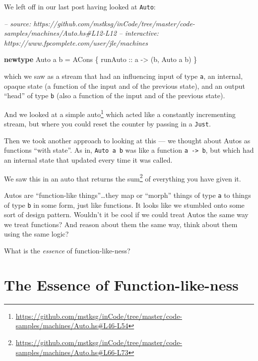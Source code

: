 \documentclass[]{article}
\newenvironment{Shaded}{}{}
\newcommand{\CommentTok}[1]{\textcolor[rgb]{0.38,0.63,0.69}{\textit{#1}}}
\newcommand{\DataTypeTok}[1]{\textcolor[rgb]{0.56,0.13,0.00}{#1}}
\newcommand{\FunctionTok}[1]{\textcolor[rgb]{0.02,0.16,0.49}{#1}}
\newcommand{\KeywordTok}[1]{\textcolor[rgb]{0.00,0.44,0.13}{\textbf{#1}}}
\newcommand{\NormalTok}[1]{#1}
\newcommand{\OtherTok}[1]{\textcolor[rgb]{0.00,0.44,0.13}{#1}}
\renewcommand{\href}[2]{#2\footnote{\url{#1}}}
\begin{document}
We left off in our last post having looked at \texttt{Auto}:

\begin{Shaded}
\begin{Highlighting}[]
\CommentTok{-- source: https://github.com/mstksg/inCode/tree/master/code-samples/machines/Auto.hs#L12-L12}
\CommentTok{-- interactive: https://www.fpcomplete.com/user/jle/machines}

\KeywordTok{newtype} \DataTypeTok{Auto}\NormalTok{ a b }\FunctionTok{=} \DataTypeTok{ACons}\NormalTok{ \{}\OtherTok{ runAuto ::}\NormalTok{ a }\OtherTok{->}\NormalTok{ (b, }\DataTypeTok{Auto}\NormalTok{ a b) \}}
\end{Highlighting}
\end{Shaded}

which we saw as a stream that had an influencing input of type \texttt{a}, an
internal, opaque state (a function of the input and of the previous state), and
an output ``head'' of type \texttt{b} (also a function of the input and of the
previous state).

And we looked at
\href{https://github.com/mstksg/inCode/tree/master/code-samples/machines/Auto.hs\#L46-L54}{a
simple auto} which acted like a constantly incrementing stream, but where you
could reset the counter by passing in a \texttt{Just}.

Then we took another approach to looking at this --- we thought about Autos as
functions ``with state''. As in, \texttt{Auto\ a\ b} was like a function
\texttt{a\ -\textgreater{}\ b}, but which had an internal state that updated
every time it was called.

We saw this in an auto that
\href{https://github.com/mstksg/inCode/tree/master/code-samples/machines/Auto.hs\#L66-L73}{returns
the sum} of everything you have given it.

Autos are ``function-like things''\ldots{}they map or ``morph'' things of type
\texttt{a} to things of type \texttt{b} in some form, just like functions. It
looks like we stumbled onto some sort of design pattern. Wouldn't it be cool if
we could treat Autos the same way we treat functions? And reason about them the
same way, think about them using the same logic?

What is the \emph{essence} of function-like-ness?

\hypertarget{the-essence-of-function-like-ness}{%
\section{The Essence of
Function-like-ness}\label{the-essence-of-function-like-ness}}
\end{document}
